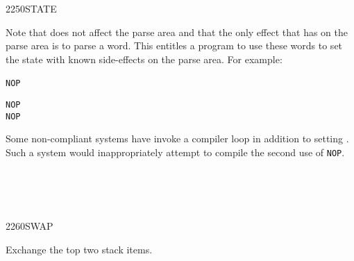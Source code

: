 \begin{worddef}{2250}{STATE}
\begin{rationale}
		Note that \word{]} does not affect the parse area and that the
		only effect that \word{:} has on the parse area is to parse a
		word. This entitles a program to use these words to set the
		state with known side-effects on the parse area. For example:

		\tab \word{:} \texttt{NOP}~
			\word{:}  \word{;} 
		\word{;}

		\tab \texttt{NOP}  \\
		\tab \texttt{NOP} 

		Some non-compliant systems have \word{]} invoke a
		compiler loop in addition to setting . Such a
		system would inappropriately attempt to compile the second
		use of \texttt{NOP}.
	\end{rationale}

	\begin{testing} %
		 \\
		 \\
		 \\
	\end{testing}
\end{worddef}


\begin{worddef}{2260}{SWAP}
\item {}

	Exchange the top two stack items.

	\begin{testing} %
	\end{testing}
\end{worddef}



